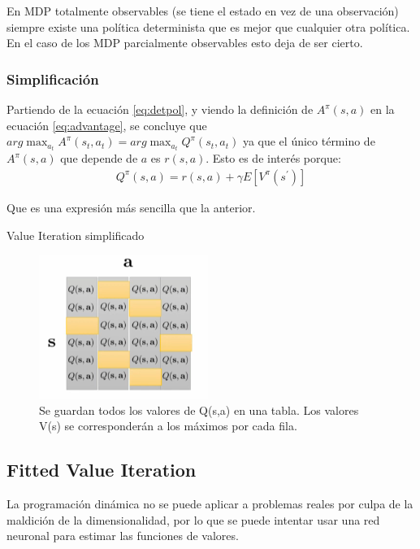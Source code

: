 En MDP totalmente observables (se tiene el estado en vez de una observación) siempre existe
una política determinista que es mejor que cualquier otra política. En el caso de los MDP
parcialmente observables esto deja de ser cierto.

\subsubsection{Simplificación}%
\label{ssub:simplificación}

Partiendo de la ecuación \ref{eq:detpol}, y viendo la definición de $A^\pi(s,a)$ en la ecuación
\ref{eq:advantage}, se concluye que
$arg\max_{a_t}A^\pi(s_t,a_t)=arg\max_{a_t}Q^\pi(s_t,a_t)$ ya que el único término de
$A^\pi(s,a)$ que depende de  $a$ es $r(s,a)$. Esto es de interés porque:
\begin{align}
Q ^ { \pi } ( s , a ) = r ( s , a ) + \gamma E [ V ^ { \pi } ( s ^ { \prime } ) ]
\end{align}

Que es una expresión más sencilla que la anterior.

\begin{algorithm}
    \caption{Value Iteration simplificado}
\end{algorithm}

\begin{figure}[htpb]
	\centering
	\includegraphics[width=0.2\linewidth]{figures/2020-06-15-113002_208x177_scrot.png}
    \caption{Se guardan todos los valores de Q(s,a) en una tabla. Los valores V(s) se
    corresponderán a los máximos por cada fila.}
\end{figure}

\subsection{Fitted Value Iteration}%
\label{sub:fitted_value_iteration}

La programación dinámica no se puede aplicar a problemas reales por culpa de la maldición de la
dimensionalidad, por lo que se puede intentar usar una red neuronal para estimar las funciones de valores.

